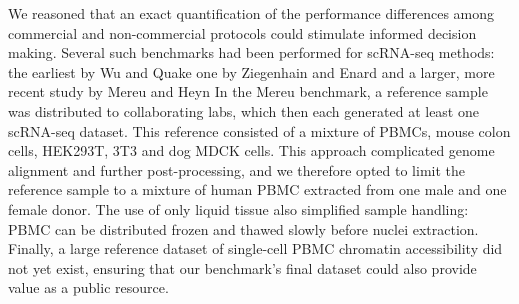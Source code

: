 We reasoned that an exact quantification of the performance differences among commercial and non-commercial protocols could stimulate informed decision making. Several such benchmarks had been performed for scRNA-seq methods: the earliest by Wu and Quake one by Ziegenhain and Enard and a larger, more recent study by Mereu and Heyn In the Mereu benchmark, a reference sample was distributed to collaborating labs, which then each generated at least one scRNA-seq dataset. This reference consisted of a mixture of PBMCs, mouse colon cells, HEK293T, 3T3 and dog MDCK cells. This approach complicated genome alignment and further post-processing, and we therefore opted to limit the reference sample to a mixture of human PBMC extracted from one male and one female donor. The use of only liquid tissue also simplified sample handling: PBMC can be distributed frozen and thawed slowly before nuclei extraction. Finally, a large reference dataset of single-cell PBMC chromatin accessibility did not yet exist, ensuring that our benchmark's final dataset could also provide value as a public resource.

